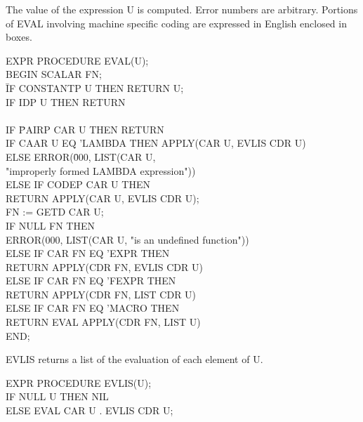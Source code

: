 \documentclass[11pt,letterpaper]{book}
\begin{document}
{The value of the expression U is computed. Error numbers are
arbitrary. Portions of EVAL involving machine specific coding are
expressed in English enclosed in boxes.

{\tt \begin{tabbing} EXPR PROCEDURE EVAL(U); \\ BEGIN SCALAR FN; \\
\hspace*{2em} \= IF CONSTANTP U THEN RETURN U; \\
\> IF IDP U THEN RETURN \\
\> \hspace{1em}  \\
\> IF \= PAIRP CAR U THEN RETURN \\
\> \> IF CAAR U EQ 'LAMBDA THEN APPLY(CAR U, EVLIS CDR U) \\
\> \> ELSE ERROR(\= 000, LIST(CAR U, \\
\> \> \> "improperly formed LAMBDA expression")) \\
\> \> ELSE IF CODEP CAR U THEN \\
\> \> \> RETURN APPLY(CAR U, EVLIS CDR U); \\
\> FN := GETD CAR U; \\
\> IF NULL FN THEN \\
\> \> ERROR(000, LIST(CAR U, "is an undefined function")) \\
\> ELSE IF CAR FN EQ 'EXPR THEN \\
\> \> RETURN APPLY(CDR FN, EVLIS CDR U) \\
\> ELSE IF CAR FN EQ 'FEXPR THEN \\
\> \> RETURN APPLY(CDR FN, LIST CDR U) \\
\> ELSE IF CAR FN EQ 'MACRO THEN \\
\> \> RETURN EVAL APPLY(CDR FN, LIST U) \\
END;
\end{tabbing}}}

{EVLIS returns a list of the evaluation of each element of U.

{\tt \begin{tabbing} EXPR PROCEDURE EVLIS(U); \\
\hspace*{1em} IF NULL U THEN NIL \\
\hspace*{2em} ELSE EVAL CAR U . EVLIS CDR U;
\end{tabbing}}}
\end{document}
